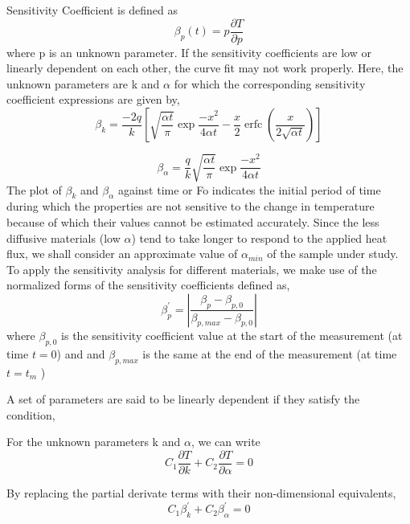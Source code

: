 \documentclass[12pt]{report}
\DeclareMathOperator{\erfc}{erfc}
\begin{document}
 Sensitivity Coefficient is defined as
\begin{equation}
\beta_{p}(t) = p \frac{\partial T}{\partial p}
\end{equation}
where p is an unknown parameter. If the sensitivity coefficients are low
or linearly dependent on each other, the curve fit may not work
properly. Here, the unknown parameters are k and $\alpha$ for which
the corresponding sensitivity coefficient expressions are given by,
\begin{equation}
\beta_{k} =\frac{-2q}{k} \left[ \sqrt{\frac{\alpha t}{\pi}}\exp{\frac{-x^{2}}{4 \alpha t}} - \frac{x}{2}\erfc{(\frac{x}{2 \sqrt{\alpha t}})}\right]
\end{equation}

\begin{equation}
\beta_{\alpha} = \frac{q}{k}\sqrt{\frac{\alpha t}{\pi}}\exp{\frac{-x^2}{4 \alpha t}}
\end{equation}
The plot of $\beta_{k}$ and $\beta_{\alpha}$ against time or Fo
indicates the initial period of time during which the properties are not
sensitive to the change in temperature because of which their values
cannot be estimated accurately. Since the less diffusive materials (low
\(\alpha\)) tend to take longer to respond to the applied heat flux, we
shall consider an approximate value of $\alpha_{min}$ of the sample
under study. To apply the sensitivity analysis for different materials, we make use of the
normalized forms of the sensitivity coefficients defined as,
\begin{equation}
\beta_p^{'} =\left|\frac{\beta_p - \beta_{p,0}}{\beta_{p,max} - \beta_{p,0}}\right|
\end{equation}
 where $\beta_{p,0}$ is the sensitivity coefficient value at the start
of the measurement (at time $t = 0$) and and $ \beta_{p,max}$ is the
same at the end of the measurement (at time $t=t_m$ )



A set of parameters are said to be linearly dependent if they satisfy the condition,


For the unknown parameters k and $\alpha$, we can write
\begin{equation*}
 C_1 \frac{\partial T}{\partial k} + C_2 \frac{\partial T}{\partial \alpha} = 0 
\end{equation*}


By replacing the partial derivate terms with their non-dimensional equivalents,
\begin{equation*}
 C_1 \beta_{k}^{'} + C_2 \beta_{\alpha}^{'} = 0
\end{equation*}
\end{document}
